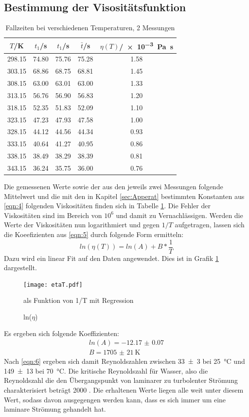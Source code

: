 \subsection{Bestimmung der Visositätsfunktion}
\begin{table}[h]
  \centering
  \caption{Fallzeiten bei verschiedenen Temperaturen, 2 Messungen}
  \label{tab:4}
  \begin{tabular}{c c c c c}
    \toprule
    $T$/\si{\kelvin} & $t_1$/\si{\second} & $t_1$/\si{\second} & $\bar{t}$/\si{\second} & $\eta(T)$/\SI{e-3}{\pascal\second} \\
    \midrule
    298.15 & 74.80 & 75.76 & 75.28 & 1.58 \\
    303.15 & 68.86 & 68.75 & 68.81 & 1.45 \\
    308.15 & 63.00 & 63.01 & 63.00 & 1.33 \\
    313.15 & 56.76 & 56.90 & 56.83 & 1.20 \\
    318.15 & 52.35 & 51.83 & 52.09 & 1.10 \\
    323.15 & 47.23 & 47.93 & 47.58 & 1.00 \\
    328.15 & 44.12 & 44.56 & 44.34 & 0.93 \\
    333.15 & 40.64 & 41.27 & 40.95 & 0.86 \\
    338.15 & 38.49 & 38.29 & 38.39 & 0.81 \\
    343.15 & 36.24 & 35.75 & 36.00 & 0.76 \\
    \bottomrule
  \end{tabular}
\end{table}
Die gemessenen Werte sowie der aus den jeweils zwei Messungen folgende Mittelwert
und die mit den in Kapitel \ref{sec:Apperat} bestimmten Konstanten aus \eqref{eqn:4} folgenden
Viskositäten finden sich in Tabelle \ref{tab:4}. Die Fehler der Viskositäten sind im Bereich von $10^6$
und damit zu Vernachlässigen. Werden die Werte der Viskositäten nun logarithmiert und gegen
$1/T$ aufgetragen, lassen sich die Koeefizienten aus \eqref{eqn:5} durch folgende Form
ermitteln:
\begin{equation}
  ln(\eta(T)) = ln(A) + B * \frac{1}{T}
\end{equation}
Dazu wird ein linear Fit auf den Daten angewendet. Dies ist in Grafik \ref{plot:1} dargestellt.
\begin{figure}[h]
  \centering
     \texttt{[image: etaT.pdf]}
  \caption{ln($\eta$)} als Funktion von 1/T mit Regression
  \label{plot:1}
\end{figure}
Es ergeben sich folgende Koeffizienten:
\begin{equation*}
  \begin{split}
    ln(A) = \num{-12.17(7)} \\
    B = \SI{1705(21)}{\kelvin}
  \end{split}
\end{equation*}
Nach \eqref{eqn:6} ergeben sich damit Reynoldszahlen zwischen \num{33(3)} bei \SI{25}{\celsius}
und \num{149(13)} bei \SI{70}{\celsius}. Die kritische Reynoldszahl für Wasser, also die Reynoldszahl die den Übergangspunkt von
laminarer zu turbolenter Strömung charakterisiert beträgt 2000 \cite[4]{Reynold}. Die erhaltenen Werte liegen alle weit unter diesem Wert,
sodass davon ausgegengen werden kann, dass es sich immer um eine laminare Strömung gehandelt hat.
